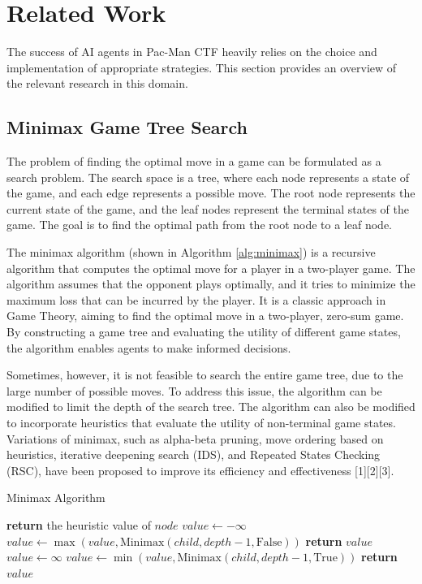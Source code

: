 \documentclass[a4paper,12pt]{article}
\begin{document}
\section{Related Work}
\label{rel_work}

The success of AI agents in Pac-Man CTF heavily relies on the choice and implementation of appropriate strategies. This section provides an overview of the relevant research in this domain.

\subsection{Minimax Game Tree Search}
\label{subsec:minimax}
The problem of finding the optimal move in a game can be formulated as a search problem. The search space is a tree, where each node represents a state of the game, and each edge represents a possible move. The root node represents the current state of the game, and the leaf nodes represent the terminal states of the game. The goal is to find the optimal path from the root node to a leaf node. 

The minimax algorithm (shown in Algorithm \ref{alg:minimax}) is a recursive algorithm that computes the optimal move for a player in a two-player game. The algorithm assumes that the opponent plays optimally, and it tries to minimize the maximum loss that can be incurred by the player. It is a classic approach in Game Theory, aiming to find the optimal move in a two-player, zero-sum game. By constructing a game tree and evaluating the utility of different game states, the algorithm enables agents to make informed decisions. 

Sometimes, however, it is not feasible to search the entire game tree, due to the large number of possible moves. To address this issue, the algorithm can be modified to limit the depth of the search tree. The algorithm can also be modified to incorporate heuristics that evaluate the utility of non-terminal game states. Variations of minimax, such as alpha-beta pruning, move ordering based on heuristics, iterative deepening search (IDS), and Repeated States Checking (RSC), have been proposed to improve its efficiency and effectiveness [1][2][3].

\begin{algorithm}
\caption{Minimax Algorithm}
\label{alg:minimax}
\begin{algorithmic}[1]
\State \textbf{return} the heuristic value of $node$
\EndIf
{}
\State $value \gets -\infty$
\State $value \gets \max(value, \text{Minimax}(child, depth-1, \text{False}))$
\EndFor
\State \textbf{return} $value$
\Else
\State $value \gets \infty$
\State $value \gets \min(value, \text{Minimax}(child, depth-1, \text{True}))$
\EndFor
\State \textbf{return} $value$
\EndIf
\EndProcedure
\end{algorithmic}
\end{algorithm}
\end{document}
